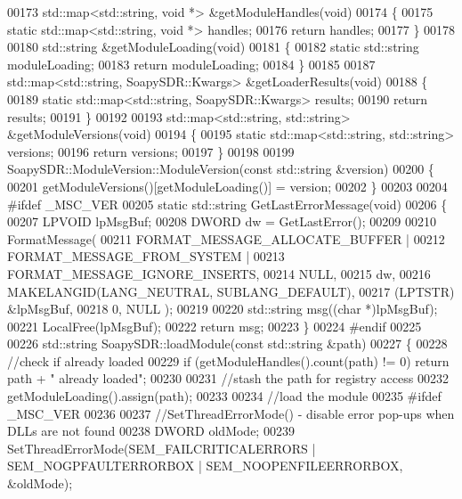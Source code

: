 \begin{DoxyCode}
{00173 std::map<std::string, void *> &getModuleHandles(\textcolor{keywordtype}{void})
00174 \{
00175     \textcolor{keyword}{static} std::map<std::string, void *> handles;
00176     \textcolor{keywordflow}{return} handles;
00177 \}
00178 
00180 std::string &getModuleLoading(\textcolor{keywordtype}{void})
00181 \{
00182     \textcolor{keyword}{static} std::string moduleLoading;
00183     \textcolor{keywordflow}{return} moduleLoading;
00184 \}
00185 
00187 std::map<std::string, SoapySDR::Kwargs> &getLoaderResults(\textcolor{keywordtype}{void})
00188 \{
00189     \textcolor{keyword}{static} std::map<std::string, SoapySDR::Kwargs> results;
00190     \textcolor{keywordflow}{return} results;
00191 \}
00192 
00193 std::map<std::string, std::string> &getModuleVersions(\textcolor{keywordtype}{void})
00194 \{
00195     \textcolor{keyword}{static} std::map<std::string, std::string> versions;
00196     \textcolor{keywordflow}{return} versions;
00197 \}
00198 
00199 SoapySDR::ModuleVersion::ModuleVersion(\textcolor{keyword}{const} std::string &version)
00200 \{
00201     getModuleVersions()[getModuleLoading()] = version;
00202 \}
00203 
00204 \textcolor{preprocessor}{#ifdef \_MSC\_VER}
00205 \textcolor{keyword}{static} std::string GetLastErrorMessage(\textcolor{keywordtype}{void})
00206 \{
00207     LPVOID lpMsgBuf;
00208     DWORD dw = GetLastError();
00209 
00210     FormatMessage(
00211         FORMAT\_MESSAGE\_ALLOCATE\_BUFFER |
00212         FORMAT\_MESSAGE\_FROM\_SYSTEM |
00213         FORMAT\_MESSAGE\_IGNORE\_INSERTS,
00214         NULL,
00215         dw,
00216         MAKELANGID(LANG\_NEUTRAL, SUBLANG\_DEFAULT),
00217         (LPTSTR) &lpMsgBuf,
00218         0, NULL );
00219 
00220     std::string msg((\textcolor{keywordtype}{char} *)lpMsgBuf);
00221     LocalFree(lpMsgBuf);
00222     \textcolor{keywordflow}{return} msg;
00223 \}
00224 \textcolor{preprocessor}{#endif}
00225 
00226 std::string SoapySDR::loadModule(\textcolor{keyword}{const} std::string &path)
00227 \{
00228     \textcolor{comment}{//check if already loaded}
00229     \textcolor{keywordflow}{if} (getModuleHandles().count(path) != 0) \textcolor{keywordflow}{return} path + \textcolor{stringliteral}{" already loaded"};
00230 
00231     \textcolor{comment}{//stash the path for registry access}
00232     getModuleLoading().assign(path);
00233 
00234     \textcolor{comment}{//load the module}
00235 \textcolor{preprocessor}{#ifdef \_MSC\_VER}
00236 
00237     \textcolor{comment}{//SetThreadErrorMode() - disable error pop-ups when DLLs are not found}
00238     DWORD oldMode;
00239     SetThreadErrorMode(SEM\_FAILCRITICALERRORS | SEM\_NOGPFAULTERRORBOX | SEM\_NOOPENFILEERRORBOX, &oldMode);
}
\end{DoxyCode}
